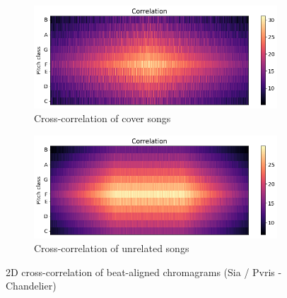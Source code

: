 \begin{figure}[htbp]
{{			\begin{subfigure}{.495\textwidth}
				\centering    
				\includegraphics[scale=0.3]{Images/Chroma/cross_hurricane.png}
				\caption{Cross-correlation of cover songs}
				\label{cc1}
			\end{subfigure}		
			\begin{subfigure}{.495\textwidth}
				\centering     
				\includegraphics[scale=0.3]{Images/Chroma/cross_hurricane_sia.png}
				\caption{Cross-correlation of unrelated songs}
				\label{cc2}
			\end{subfigure}%
	}}
	\caption{2D cross-correlation of beat-aligned chromagrams (Sia / Pvris - Chandelier)}
	\label{fig:crosscorr}
\end{figure}
\FloatBarrier

